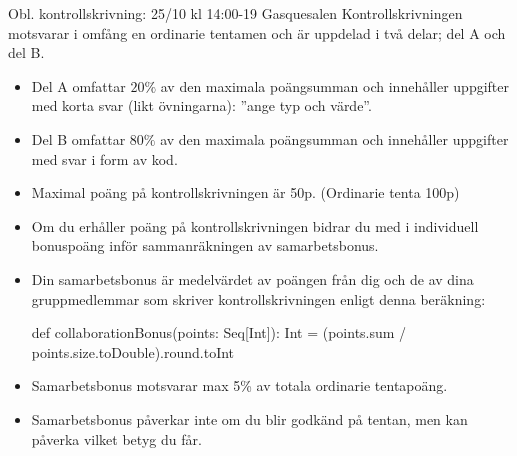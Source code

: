 

\ifkompendium\else



\begin{Slide}{Obl. kontrollskrivning: 25/10 kl 14:00-19 Gasquesalen}\SlideFontSmall
Kontrollskrivningen motsvarar i omfång en  ordinarie tentamen och är uppdelad i två delar; del A och del B.
\begin{itemize}\SlideFontTiny

\item Del A omfattar $20\%$ av den maximala poängsumman och innehåller uppgifter med korta svar (likt övningarna): ''ange typ och värde''.
\item Del B omfattar $80\%$ av den maximala poängsumman och innehåller uppgifter med svar i form av kod.

\item Maximal poäng på kontrollskrivningen är 50p. (Ordinarie tenta 100p)

\item Om du erhåller  poäng på kontrollskrivningen bidrar du med  i individuell bonuspoäng inför sammanräkningen av samarbetsbonus.


\item Din samarbetsbonus är medelvärdet av poängen från dig och de av dina gruppmedlemmar som skriver kontrollskrivningen enligt denna beräkning:
\begin{Code}
  def collaborationBonus(points: Seq[Int]): Int =
    (points.sum / points.size.toDouble).round.toInt
\end{Code}

\item Samarbetsbonus motsvarar max 5\% av totala ordinarie tentapoäng.


\item Samarbetsbonus påverkar inte om du blir godkänd på tentan, men kan påverka vilket betyg du får.


\end{itemize}
\end{Slide}


